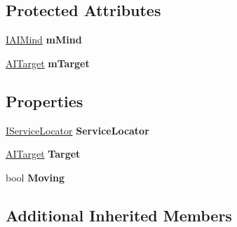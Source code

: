 \subsection*{Protected Attributes}
\begin{DoxyCompactItemize}
\item 
\mbox{\label{class_g_m_t_b_1_1_entities_1_1_a_i_1_1_basic_a_i_a7d5e02ec8de9e32593c3b810fbfc22aa}} 
\mbox{\hyperlink{interface_g_m_t_b_1_1_interfaces_1_1_i_a_i_mind}{I\+A\+I\+Mind}} {\bfseries m\+Mind}
\item 
\mbox{\label{class_g_m_t_b_1_1_entities_1_1_a_i_1_1_basic_a_i_a070753a1fa3d7c96111e41613df67c9a}} 
\mbox{\hyperlink{interface_g_m_t_b_1_1_interfaces_1_1_a_i_target}{A\+I\+Target}} {\bfseries m\+Target}
\end{DoxyCompactItemize}
\subsection*{Properties}
\begin{DoxyCompactItemize}
\item 
\mbox{\label{class_g_m_t_b_1_1_entities_1_1_a_i_1_1_basic_a_i_aec3b361d3043c668b7aa3c9365ce2119}} 
\mbox{\hyperlink{interface_g_m_t_b_1_1_interfaces_1_1_i_service_locator}{I\+Service\+Locator}} {\bfseries Service\+Locator}
\item 
\mbox{\label{class_g_m_t_b_1_1_entities_1_1_a_i_1_1_basic_a_i_aaef2b47577b9d99279e3513312e2cef8}} 
\mbox{\hyperlink{interface_g_m_t_b_1_1_interfaces_1_1_a_i_target}{A\+I\+Target}} {\bfseries Target}
\item 
\mbox{\label{class_g_m_t_b_1_1_entities_1_1_a_i_1_1_basic_a_i_a21d9f4cc0fd706c11c5eadacff615913}} 
bool {\bfseries Moving}
\end{DoxyCompactItemize}
\subsection*{Additional Inherited Members}


